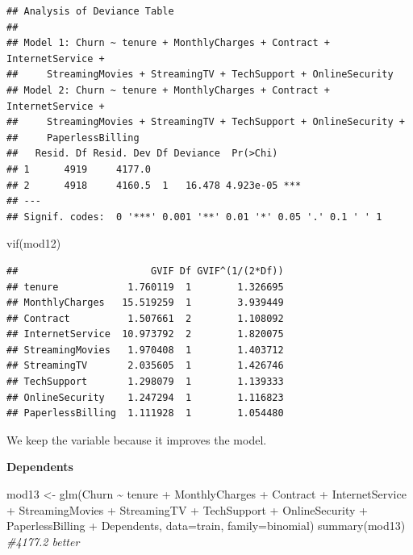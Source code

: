 \documentclass[
  twoside]{article}
\newenvironment{Shaded}{\begin{snugshade}}{\end{snugshade}}
\newcommand{\AttributeTok}[1]{\textcolor[rgb]{0.77,0.63,0.00}{#1}}
\newcommand{\CommentTok}[1]{\textcolor[rgb]{0.56,0.35,0.01}{\textit{#1}}}
\newcommand{\FunctionTok}[1]{\textcolor[rgb]{0.00,0.00,0.00}{#1}}
\newcommand{\NormalTok}[1]{#1}
\newcommand{\OtherTok}[1]{\textcolor[rgb]{0.56,0.35,0.01}{#1}}
\newcommand{\SpecialCharTok}[1]{\textcolor[rgb]{0.00,0.00,0.00}{#1}}
\begin{document}
\begin{verbatim}
## Analysis of Deviance Table
## 
## Model 1: Churn ~ tenure + MonthlyCharges + Contract + InternetService + 
##     StreamingMovies + StreamingTV + TechSupport + OnlineSecurity
## Model 2: Churn ~ tenure + MonthlyCharges + Contract + InternetService + 
##     StreamingMovies + StreamingTV + TechSupport + OnlineSecurity + 
##     PaperlessBilling
##   Resid. Df Resid. Dev Df Deviance  Pr(>Chi)    
## 1      4919     4177.0                          
## 2      4918     4160.5  1   16.478 4.923e-05 ***
## ---
## Signif. codes:  0 '***' 0.001 '**' 0.01 '*' 0.05 '.' 0.1 ' ' 1
\end{verbatim}

\begin{Shaded}
\begin{Highlighting}[]
\FunctionTok{vif}\NormalTok{(mod12)}
\end{Highlighting}
\end{Shaded}

\begin{verbatim}
##                       GVIF Df GVIF^(1/(2*Df))
## tenure            1.760119  1        1.326695
## MonthlyCharges   15.519259  1        3.939449
## Contract          1.507661  2        1.108092
## InternetService  10.973792  2        1.820075
## StreamingMovies   1.970408  1        1.403712
## StreamingTV       2.035605  1        1.426746
## TechSupport       1.298079  1        1.139333
## OnlineSecurity    1.247294  1        1.116823
## PaperlessBilling  1.111928  1        1.054480
\end{verbatim}

We keep the variable because it improves the model.

\textbf{Dependents}

\begin{Shaded}
\begin{Highlighting}[]
\NormalTok{mod13 }\OtherTok{\textless{}{-}} \FunctionTok{glm}\NormalTok{(Churn }\SpecialCharTok{\textasciitilde{}}\NormalTok{ tenure }\SpecialCharTok{+}\NormalTok{ MonthlyCharges }\SpecialCharTok{+}\NormalTok{ Contract }\SpecialCharTok{+}\NormalTok{ InternetService }\SpecialCharTok{+} 
\NormalTok{               StreamingMovies }\SpecialCharTok{+}\NormalTok{ StreamingTV }\SpecialCharTok{+}\NormalTok{ TechSupport }\SpecialCharTok{+}\NormalTok{ OnlineSecurity }\SpecialCharTok{+} 
\NormalTok{               PaperlessBilling }\SpecialCharTok{+}\NormalTok{ Dependents, }\AttributeTok{data=}\NormalTok{train, }\AttributeTok{family=}\NormalTok{binomial)}
\FunctionTok{summary}\NormalTok{(mod13) }\CommentTok{\#4177.2 better}
\end{Highlighting}
\end{Shaded}
\end{document}
